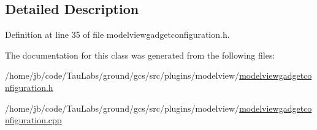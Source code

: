 \subsection{\-Detailed \-Description}


\-Definition at line 35 of file modelviewgadgetconfiguration.\-h.



\-The documentation for this class was generated from the following files\-:\begin{DoxyCompactItemize}
\item 
/home/jb/code/\-Tau\-Labs/ground/gcs/src/plugins/modelview/\hyperlink{modelviewgadgetconfiguration_8h}{modelviewgadgetconfiguration.\-h}\item 
/home/jb/code/\-Tau\-Labs/ground/gcs/src/plugins/modelview/\hyperlink{modelviewgadgetconfiguration_8cpp}{modelviewgadgetconfiguration.\-cpp}\end{DoxyCompactItemize}
